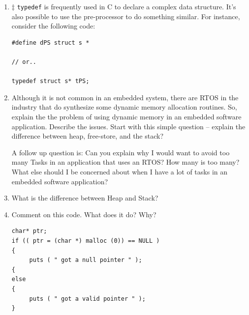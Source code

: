 \documentclass[12pt]{article}
\begin{document}
\begin{enumerate}
\item $\ddagger$ {\texttt{typedef}} is frequently used in C to declare a complex
data structure.   It's also possible to use the pre-processor to do
something similar.  For instance, consider the following code:

\begin{lstlisting}
#define dPS struct s *

// or..

typedef struct s* tPS;
\end{lstlisting}

\item Although it is not common in an embedded system, there are RTOS
in the industry that do synthesize some dynamic memory allocation
routines.  So, explain the the problem of using dynamic memory
in an embedded software application.  Describe the issues. Start 
with this simple question -- explain the difference between heap, 
free-store, and the stack?

A follow up question is:   Can you explain why I would want to avoid
too many Tasks in an application that uses an RTOS?  How many is too many?
What else should I be concerned about when I have a lot of tasks in an
embedded software application?

\item What is the difference between Heap and Stack?

\item Comment on this code.  What does it do?  Why?

\begin{lstlisting}
char* ptr;
if (( ptr = (char *) malloc (0)) == NULL )
{
     puts ( " got a null pointer " );
{
else
{
     puts ( " got a valid pointer " );
}
\end{lstlisting} 

\end{enumerate}

\end{document}
